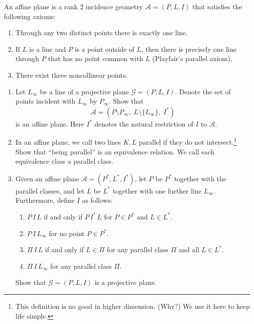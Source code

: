 \documentclass[11pt, a4paper]{ctexrep}
\begin{document}
\begin{exercise}
    An affine plane is a rank $2$ incidence geometry $\mathcal{A}=(P,L,I)$ that satisfies the
    following axioms:
    \begin{enumerate}
        \item[(AP1)] Through any two distinct points there is exactly one line.
        \item[(AP2)] If $L$ is a line and $P$ is a point outside of $L$, then there is precisely one line
              through $P$ that has no point common with $L$ (Playfair's parallel axiom).
        \item[(AP3)] There exist three noncollinear points.
    \end{enumerate}
    \begin{enumerate}
        \item[(a)] Let $L_\infty$ be a line of a projective plane $\mathcal{G}=(P,L,I)$. Denote the set
              of points incident with $L_\infty$ by $P_\infty$. Show that
              \[
                  \mathcal{A}=(P\setminus P_\infty,\; L\setminus \{L_\infty\},\; I^*)
              \]
              is an affine plane. Here $I^*$ denotes the natural restriction of $I$ to $\mathcal{A}$.
        \item[(b)] In an affine plane, we call two lines $K,L$ parallel if they do not intersect.\footnote{This definition is no good in higher dimension. (Why?) We use it here to keep life simple.}
              Show that ``being parallel'' is an equivalence relation. We call each equivalence class
              a parallel class.
        \item[(c)] Given an affine plane $\mathcal{A}=(P^*,L^*,I^*)$, let $P$ be $P^*$ together with the
              parallel classes, and let $L$ be $L^*$ together with one further line $L_\infty$.
              Furthermore, define $I$ as follows:
              \begin{enumerate}
                  \item[(i)] $P\,I\,L$ if and only if $P\,I^*\,L$ for $P\in P^*$ and $L\in L^*$.
                  \item[(ii)] $P\,I\,L_\infty$ for no point $P\in P^*$.
                  \item[(iii)] $\Pi\,I\,L$ if and only if $L\in \Pi$ for any parallel class $\Pi$ and all $L\in L^*$.
                  \item[(iv)] $\Pi\,I\,L_\infty$ for any parallel class $\Pi$.
              \end{enumerate}
              Show that $\mathcal{G}=(P,L,I)$ is a projective plane.
    \end{enumerate}
\end{exercise}
\end{document}

